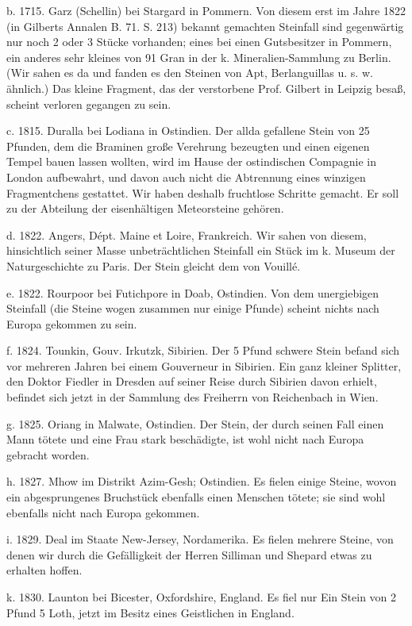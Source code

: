 \documentclass[a4paper, 11pt, oneside, polutonikogreek, german]{article}
\begin{document}
b. 1715. Garz (Schellin) bei Stargard in Pommern. Von diesem erst im Jahre 1822 (in Gilberts Annalen B. 71. S. 213) bekannt gemachten Steinfall sind gegenwärtig nur noch 2 oder 3 Stücke vorhanden; eines bei einen Gutsbesitzer in Pommern, ein anderes sehr kleines von 91 Gran in der k. Mineralien-Sammlung zu Berlin. (Wir sahen es da und fanden es den Steinen von Apt, Berlanguillas u. s. w. ähnlich.) Das kleine Fragment, das der verstorbene Prof. Gilbert in Leipzig besaß, scheint verloren gegangen zu sein.

c. 1815. Duralla bei Lodiana in Ostindien. Der allda gefallene Stein von 25 Pfunden, dem die Braminen große Verehrung bezeugten und einen eigenen Tempel bauen lassen wollten, wird im Hause der ostindischen Compagnie in London aufbewahrt, und davon auch nicht die Abtrennung eines winzigen Fragmentchens gestattet. Wir haben deshalb fruchtlose Schritte gemacht. Er soll zu der Abteilung der eisenhältigen Meteorsteine gehören.

d. 1822. Angers, Dépt. Maine et Loire, Frankreich. Wir sahen von diesem, hinsichtlich seiner Masse unbeträchtlichen Steinfall ein Stück im k. Museum der Naturgeschichte zu Paris. Der Stein gleicht dem von Vouillé.

e. 1822. Rourpoor bei Futichpore in Doab, Ostindien. Von dem unergiebigen Steinfall (die Steine wogen zusammen nur einige Pfunde) scheint nichts nach Europa gekommen zu sein.

f. 1824. Tounkin, Gouv. Irkutzk, Sibirien. Der 5 Pfund schwere Stein befand sich vor mehreren Jahren bei einem Gouverneur in Sibirien. Ein ganz kleiner Splitter, den Doktor Fiedler in Dresden auf seiner Reise durch Sibirien davon erhielt, befindet sich jetzt in der Sammlung des Freiherrn von Reichenbach in Wien.

g. 1825. Oriang in Malwate, Ostindien. Der Stein, der durch seinen Fall einen Mann tötete und eine Frau stark beschädigte, ist wohl nicht nach Europa gebracht worden.

h. 1827. Mhow im Distrikt Azim-Gesh; Ostindien. Es fielen einige Steine, wovon ein abgesprungenes Bruchstück ebenfalls einen Menschen tötete; sie sind wohl ebenfalls nicht nach Europa gekommen.

i. 1829. Deal im Staate New-Jersey, Nordamerika. Es fielen mehrere Steine, von denen wir durch die Gefälligkeit der Herren Silliman und Shepard etwas zu erhalten hoffen.

k. 1830. Launton bei Bicester, Oxfordshire, England. Es fiel nur Ein Stein von 2 Pfund 5 Loth, jetzt im Besitz eines Geistlichen in England.
\end{document}
